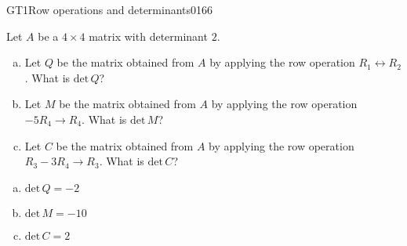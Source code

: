 \begin{exercise}{GT1}{Row operations and determinants}{0166} 
\begin{exerciseStatement} 

Let \(A\) be a \(4 \times 4\) matrix with determinant \(2\).

 

\begin{enumerate}[(a)]
\item Let \(Q\) be the matrix obtained from \(A\) by applying the row operation \(R_1 \leftrightarrow R_2\). What is \(\mathrm{det}\,Q\)?
\item Let \(M\) be the matrix obtained from \(A\) by applying the row operation \(-5 R_4 \to R_4\). What is \(\mathrm{det}\,M\)?
\item Let \(C\) be the matrix obtained from \(A\) by applying the row operation \(R_3 - 3 R_4 \to R_3\). What is \(\mathrm{det}\,C\)?
\end{enumerate}

     \end{exerciseStatement}
 \begin{exerciseAnswer} 

\begin{enumerate}[(a)]
\item \(\mathrm{det}\,Q=-2\)
\item \(\mathrm{det}\,M=-10\)
\item \(\mathrm{det}\,C=2\)
\end{enumerate}

     \end{exerciseAnswer}
 \end{exercise}


\newpage





